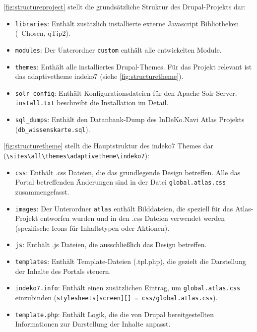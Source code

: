 \cref{fig:structureproject} stellt die grundsätzliche Struktur des Drupal-Projekts dar:
\begin{itemize}
	\item \lstinline|libraries|: Enthält zusätzlich installierte externe Javascript Bibliotheken (\zB\ Chosen, qTip2).
	
	\item \lstinline|modules|: Der Unterordner \lstinline|custom| enthält alle entwickelten Module.
	
	\item \lstinline|themes|: Enthält alle installiertes Drupal-Themes. Für das Projekt relevant ist das adaptivetheme indeko7 (siehe \cref{fig:structuretheme}).
	
	\item \lstinline|solr_config|: Enthält Konfigurationsdateien für den Apache Solr Server. \lstinline|install.txt| beschreibt die Installation im Detail.
	
	\item \lstinline|sql_dumps|: Enthält den Datanbank-Dump des InDeKo.Navi Atlas Projekts  (\lstinline|db_wissenskarte.sql|).
\end{itemize}



\cref{fig:structuretheme} stellt die Hauptstruktur des indeko7 Themes dar (\lstinline|\sites\all\themes\adaptivetheme\indeko7|):
\begin{itemize}
	\item \lstinline|css|: Enthält .css Dateien, die das grundlegende Design betreffen. Alle das Portal betreffenden Änderungen sind in der Datei \lstinline|global.atlas.css| zusammengefasst.
	
	\item \lstinline|images|: Der Unterordner \lstinline|atlas| enthält Bilddateien, die speziell für das Atlas-Projekt entworfen wurden und in den .css Dateien verwendet werden (\zB spezifische Icons für Inhaltstypen oder Aktionen).
	
	\item \lstinline|js|: Enthält .js Dateien, die ausschließlich das Design betreffen. 
	
	\item \lstinline|templates|: Enthält Template-Dateien (.tpl.php), die gezielt die Darstellung der Inhalte des Portals steuern.
	
	\item \lstinline|indeko7.info|: Enthält einen zusätzlichen Eintrag, um \lstinline|global.atlas.css| einzubinden (\lstinline|stylesheets[screen][] = css/global.atlas.css|).
	
	\item \lstinline|template.php|: Enthält Logik, die die von Drupal bereitgestellten Informationen zur Darstellung der Inhalte anpasst.
	
\end{itemize}



